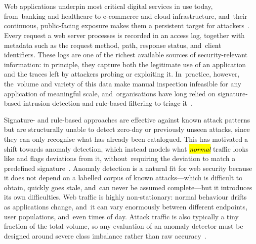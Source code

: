 \documentclass[futureinternet,article,accept,moreauthors]{Definitions/mdpi}
\begin{document}
\section{ %
} \label{sec1}

Web applications underpin most critical digital services in use today, from~banking and healthcare to e-commerce and cloud infrastructure, and~their continuous, public-facing exposure makes them a persistent target for attackers~\cite{scarfone2007}. Every request a web server processes is recorded in an access log, together with metadata such as the request method, path, response status, and~client identifiers. These logs are one of the richest available sources of security-relevant information: in principle, they capture both the legitimate use of an application and the traces left by attackers probing or exploiting it. In~practice, however, the~volume and variety of this data make manual inspection infeasible for any application of meaningful scale, and~organisations have long relied on signature-based intrusion detection and rule-based filtering to triage it~\cite{scarfone2007}.

Signature- and rule-based approaches are effective against known attack patterns but are structurally unable to detect zero-day or previously unseen attacks, since they can only recognise what has already been catalogued. This has motivated a shift towards anomaly detection, which instead models what \emph{\hl{normal}%
} traffic looks like and flags deviations from it, without~requiring the deviation to match a predefined signature~\cite{chandola2009}. Anomaly detection is a natural fit for web security because it does not depend on a labelled corpus of known attacks---which is difficult to obtain, quickly goes stale, and~can never be assumed complete---but it introduces its own difficulties. Web traffic is highly non-stationary: normal behaviour drifts as applications change, and~it can vary enormously between different endpoints, user populations, and~even times of day. Attack traffic is also typically a tiny fraction of the total volume, so any evaluation of an anomaly detector must be designed around severe class imbalance rather than raw accuracy~\cite{chandola2009}.
\end{document}
